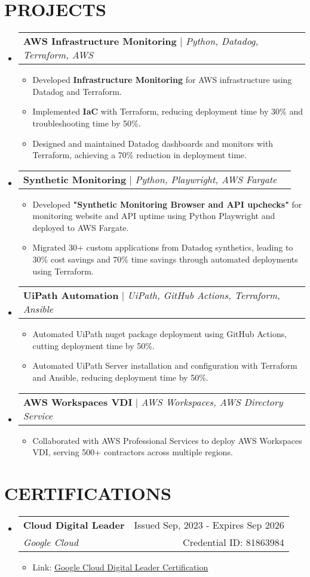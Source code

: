 \documentclass[letterpaper,11pt]{article}
\makeatletter
\newcommand{\resumeItem}[1]{
  \item\small{
    {#1 \vspace{-1pt}}
  }
}
\newcommand{\resumeSubheading}[4]{
  \vspace{-1pt}\item
    \begin{tabular*}{\textwidth}[t]{l@{\extracolsep{\fill}}r}
      \textbf{#1} & {\color{dark-grey}\small #2}\vspace{1pt}\\ %
      \textit{#3} & {\color{dark-grey} \small #4}\\ %
    \end{tabular*}\vspace{-4pt}
}
\newcommand{\resumeProjectHeading}[2]{
    \item
    \begin{tabular*}{\textwidth}{l@{\extracolsep{\fill}}r}
      #1 & {\color{dark-grey}} \\
    \end{tabular*}\vspace{-4pt}
}
\newcommand{\resumeSubHeadingListStart}{\begin{itemize}[leftmargin=0in, label={}]}
\newcommand{\resumeSubHeadingListEnd}{\end{itemize}}
\newcommand{\resumeItemListStart}{\begin{itemize}}
\newcommand{\resumeItemListEnd}{\end{itemize}\vspace{0pt}}
\makeatother
\begin{document}
\section {PROJECTS}
    \resumeSubHeadingListStart
      \resumeProjectHeading
          {\textbf{AWS Infrastructure Monitoring} $|$ \emph{Python, Datadog, Terraform, AWS}}{Dec 2020 -- Present}
          \resumeItemListStart
            \resumeItem{Developed \textbf{Infrastructure Monitoring} for AWS infrastructure using Datadog and Terraform.}
            \resumeItem{Implemented \textbf{IaC} with Terraform, reducing deployment time by 30\% and troubleshooting time by 50\%.}
            \resumeItem{Designed and maintained Datadog dashboards and monitors with Terraform, achieving a 70\% reduction in deployment time.}
          \resumeItemListEnd
      \resumeProjectHeading
          {\textbf{Synthetic Monitoring} $|$ \emph{Python, Playwright, AWS Fargate}}{Dec 2020 -- Present}
          \resumeItemListStart
            \resumeItem{Developed \textbf{"Synthetic Monitoring Browser and API upchecks"} for monitoring website and API uptime using Python Playwright and deployed to AWS Fargate.}
            \resumeItem{Migrated 30+ custom applications from Datadog synthetics, leading to 30\% cost savings and 70\% time savings through automated deployments using Terraform.}
          \resumeItemListEnd
      \resumeProjectHeading
          {\textbf{UiPath Automation} $|$ \emph{UiPath, GitHub Actions, Terraform, Ansible}}{Dec 2020 -- Present}
          \resumeItemListStart
            \resumeItem{Automated UiPath nuget package deployment using GitHub Actions, cutting deployment time by 50\%.}
            \resumeItem{Automated UiPath Server installation and configuration with Terraform and Ansible, reducing deployment time by 50\%.}
          \resumeItemListEnd
      \resumeProjectHeading
          {\textbf{AWS Workspaces VDI} $|$ \emph{AWS Workspaces, AWS Directory Service}}{Dec 2020 -- Present}
          \resumeItemListStart
            \resumeItem{Collaborated with AWS Professional Services to deploy AWS Workspaces VDI, serving 500+ contractors across multiple regions.}
          \resumeItemListEnd
    \resumeSubHeadingListEnd

\section{CERTIFICATIONS}
  \resumeSubHeadingListStart

    \resumeSubheading
      {Cloud Digital Leader}{Issued Sep, 2023 - Expires Sep 2026}
      {Google Cloud}{Credential ID: 81863984}
      \resumeItemListStart
        \resumeItem{Link: \href{https://www.credential.net/ac8b2017-57db-4e03-a908-fbdf5af86321}{\underline{Google Cloud Digital Leader Certification}}}
      \resumeItemListEnd
  \resumeSubHeadingListEnd
  
\end{document}
